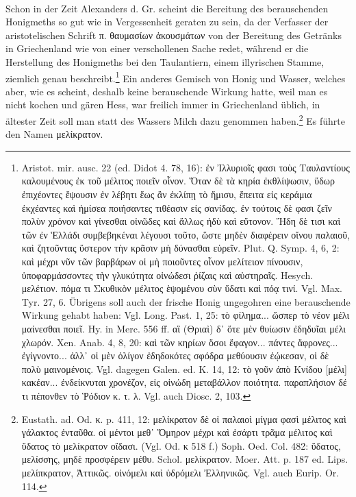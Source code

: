 \documentclass[a4paper, 11pt, oneside]{article}
\begin{document}
\paragraph{}
Schon in der Zeit Alexanders d. Gr. scheint die Bereitung des berauschenden Honigmeths so gut wie in Vergessenheit geraten zu sein, da der Verfasser der aristotelischen Schrift π. θαυμασίων ἀκουσμάτων von der Bereitung des Getränks in Griechenland wie von einer verschollenen Sache redet, während er die Herstellung des Honigmeths bei den Taulantiern, einem illyrischen Stamme, ziemlich genau beschreibt.\footnote{Aristot. mir. ausc. 22 (ed. Didot 4. 78, 16): ἐν Ἰλλυριοῖς φασι τοὺς Ταυλαντίους καλουμένους ἐκ τοῦ μέλιτος ποιεῖν οἷνον. Ὅταν δὲ τὰ κηρία ἐκθλίψωσιν, ὕδωρ ἐπιχέοντες ἔψουσιν ἐν λέβητι ἕως ἂν ἐκλίπῃ τὸ ἥμισυ, ἔπειτα εἰς κεράμια ἐκχέαντες καὶ ἡμίσεα ποιήσαντες τιθέασιν εἰς σανίδας. ἐν τούτοις δὲ φασι ζεῖν πολὺν χρόνον καὶ γίνεσθαι οἰνῶδες καὶ ἄλλως ἡδὺ καὶ εὔτονον. Ἤδη δὲ τισι καὶ τῶν ἐν Ἑλλάδι συμβεβηκέναι λέγουσι τοῦτο, ὥστε μηδὲν διαφέρειν οἴνου παλαιοῦ, καὶ ζητοῦντας ὕστερον τὴν κρᾶσιν μὴ δύνασθαι εὑρεῖν. Plut. Q. Symp. 4, 6, 2: καὶ μέχρι νῦν τῶν βαρβάρων οἱ μὴ ποιοῦντες οἶνον μελίτειον πίνουσιν, ὑποφαρμάσσοντες τὴν γλυκύτητα οἰνώδεσι ῥίζαις καὶ αὐστηραῖς. Hesych. μελέτιον. πόμα τι Σκυθικὸν μέλιτος ἑψομένου σὺν ὕδατι καὶ πόᾳ τινί. Vgl. Max. Tyr. 27, 6. Übrigens soll auch der frische Honig ungegohren eine berauschende Wirkung gehabt haben: Vgl. Long. Past. 1, 25: τὸ φίλημα... ὥσπερ τὸ νέον μέλι μαίνεσθαι ποιεῖ. Hy. in Merc. 556 ff. αἳ (Θριαὶ) δ᾽ ὅτε μὲν θυίωσιν ἐδηδυῖαι μέλι χλωρόν. Xen. Anab. 4, 8, 20: καὶ τῶν κηρίων ὅσοι ἔφαγον... πάντες ἄφρονες... ἐγίγνοντο... ἀλλ᾽ οἱ μὲν ὀλίγον ἐδηδοκότες σφόδρα μεθύουσιν ἐῴκεσαν, οἱ δὲ πολὺ μαινομένοις. Vgl. dagegen Galen. ed. K. 14, 12: τὸ γοῦν ἀπὸ Κνίδου [μέλι] κακέαν... ἐνδείκνυται χρονέζον, εἰς οἰνώδη μεταβάλλον ποιότητα. παραπλήσιον δέ τι πέπονθεν τὸ Ῥόδιον κ. τ. λ. Vgl. auch Diosc. 2, 103.} Ein anderes Gemisch von Honig und Wasser, welches aber, wie es scheint, deshalb keine berauschende Wirkung hatte, weil man es nicht kochen und gären Hess, war freilich immer in Griechenland üblich, in ältester Zeit soll man statt des Wassers Milch dazu genommen haben.\footnote{Eustath. ad. Od. κ. p. 411, 12: μελίκρατον δὲ οἱ παλαιοὶ μίγμα φασὶ μέλιτος καὶ γάλακτος ἐνταῦθα. οἱ μέντοι μεθ᾽ Ὅμηρον μέχρι καὶ ἐσάρτι τρᾶμα μέλιτος καὶ ὕδατος τὸ μελίκρατον οἴδασι. (Vgl. Od. κ 518 f.) Soph. Oed. Col. 482: ὕδατος, μελίσσης, μηδὲ προσφέρειν μέθυ. Schol. μελίκρατον. Moer. Att. p. 187 ed. Lips. μελίπκρατον, Ἀττικῶς. οἰνόμελι καὶ ὑδρόμελι Ἐλληνικῶς. Vgl. auch Eurip. Or. 114.} Es führte den Namen μελίκρατον.
\end{document}
